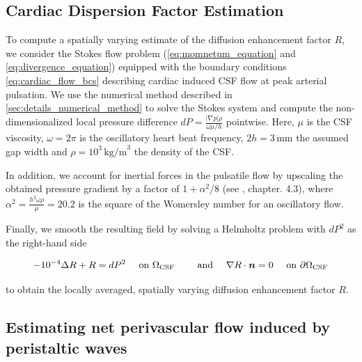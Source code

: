 \subsection{Cardiac Dispersion Factor Estimation}\label{sec:dispersion_details}

To compute a spatially varying estimate of the diffusion enhancement factor $R$, we consider the Stokes flow problem (\cref{eq:momnetum_equation} and \cref{eq:divergence_equation}) equipped with the boundary conditions \cref{eq:cardiac_flow_bcs} describing cardiac induced CSF flow at peak arterial pulsation. We use the numerical method described in \cref{sec:details_numerical_method} to solve the Stokes system and compute the non-dimensionalized local pressure difference $dP=\frac{|\nabla p| \rho}{\omega \mu / h}$ pointwise. Here, $\mu$ is the CSF viscosity, $\omega = 2 \pi$ is the oscillatory heart beat frequency, $2h=3$\,mm the assumed gap width and $\rho=10^3\,\text{kg/m}^3$ the density of the CSF.

In addition, we account for inertial forces in the pulsatile flow by upscaling the obtained pressure gradient by a factor of $1 + \alpha^2 / 8$ (see \cite{van1998cardiovascular}, chapter. 4.3), where $\alpha^2 = \frac{h^2 \omega \rho}{\mu} = 20.2$ is the square of the Womersley number for an oscillatory flow.

Finally, we smooth the resulting field by solving a Helmholtz problem with $dP^2$ as the right-hand side

\begin{equation}
- 10^{-4} \Delta R + R = dP^2 \quad \text{ on } \Omega_{\rm CSF} \qquad \text{ and } \quad \nabla R \cdot \bm n = 0 \quad \text{ on } \partial \Omega_{\rm CSF}
\end{equation}

to obtain the locally averaged, spatially varying diffusion enhancement factor $R$.

\subsection{Estimating net perivascular flow induced by peristaltic waves}
\label{sec:sup:peristalsis}

